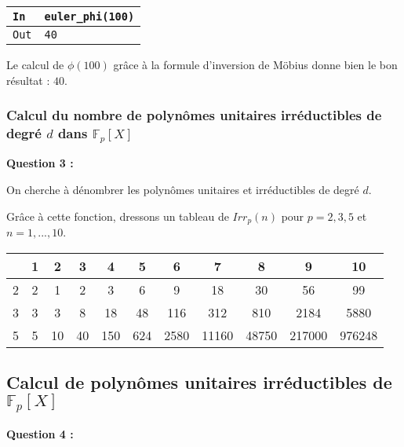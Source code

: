 \documentclass[titlepage]{article}
\begin{document}
            \begin{tabularx}{12cm}{|p{0.60cm}|X|}
                \hline
                \rowcolor{gray}
                \texttt{In}
                & 
                \texttt{euler\_phi(100)}
                \\
                \hline
                \texttt{Out}
                &
                \texttt{40}
                \\
                \hline
            \end{tabularx}
            \bigbreak

            Le calcul de $\phi (100)$ grâce à la formule d'inversion de Möbius donne bien le bon résultat : $40$.

            \subsubsection{Calcul du nombre de polynômes unitaires irréductibles de degré $d$ dans $\mathbb{F}_p[X]$}
            \textbf{Question 3 :}

            On cherche à dénombrer les polynômes unitaires et irréductibles de degré $d$.

            
            Grâce à cette fonction, dressons un tableau de $Irr_p(n)$ pour $p = 2, 3, 5$ et $n = 1, . . . , 10$.
            \bigbreak

            \begin{tabular}{|c|c c c c c c c c c c|}
                \hline
                & 1 & 2 & 3 & 4 & 5 & 6 & 7 & 8 & 9 & 10 \\
                \hline
                2 & 2 & 1 & 2 & 3 & 6 & 9 & 18 & 30 & 56 & 99 \\
                3 & 3 & 3 & 8 & 18 & 48 & 116 & 312 & 810 & 2184 & 5880 \\
                5 & 5 & 10 & 40 & 150 & 624 & 2580 & 11160 &  48750 & 217000 & 976248 \\ 
                \hline
            \end{tabular}
            \bigbreak

            \subsection{Calcul de polynômes unitaires irréductibles de $\mathbb{F}_p[X]$}

            \textbf{Question 4 :}
\end{document}
